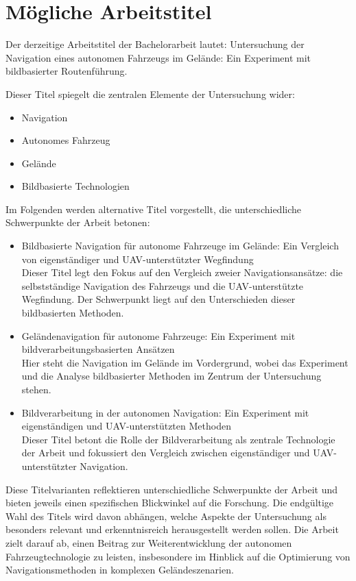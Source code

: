 \section{Mögliche Arbeitstitel}

Der derzeitige Arbeitstitel der Bachelorarbeit lautet: 
Untersuchung der Navigation eines autonomen Fahrzeugs im Gelände: Ein Experiment mit bildbasierter Routenführung.

Dieser Titel spiegelt die zentralen Elemente der Untersuchung wider:
\begin{itemize}
    \item Navigation
    \item Autonomes Fahrzeug
    \item Gelände
    \item Bildbasierte Technologien
\end{itemize}

Im Folgenden werden alternative Titel vorgestellt, die unterschiedliche Schwerpunkte der Arbeit betonen:

\begin{itemize}
    \item Bildbasierte Navigation für autonome Fahrzeuge im Gelände: Ein Vergleich von eigenständiger und UAV-unterstützter Wegfindung\\
    Dieser Titel legt den Fokus auf den Vergleich zweier Navigationsansätze: 
    die selbstständige Navigation des Fahrzeugs und die UAV-unterstützte Wegfindung. 
    Der Schwerpunkt liegt auf den Unterschieden dieser bildbasierten Methoden.

    \item Geländenavigation für autonome Fahrzeuge: Ein Experiment mit bildverarbeitungsbasierten Ansätzen\\
    Hier steht die Navigation im Gelände im Vordergrund, wobei das Experiment und die Analyse bildbasierter Methoden im Zentrum der Untersuchung stehen.

    \item Bildverarbeitung in der autonomen Navigation: Ein Experiment mit eigenständigen und UAV-unterstützten Methoden\\
    Dieser Titel betont die Rolle der Bildverarbeitung als zentrale Technologie der Arbeit und fokussiert den Vergleich zwischen eigenständiger und UAV-unterstützter Navigation.
\end{itemize}

Diese Titelvarianten reflektieren unterschiedliche Schwerpunkte der Arbeit und bieten jeweils einen spezifischen Blickwinkel auf die Forschung. 
Die endgültige Wahl des Titels wird davon abhängen, welche Aspekte der Untersuchung als besonders relevant und erkenntnisreich herausgestellt werden sollen. 
Die Arbeit zielt darauf ab, einen Beitrag zur Weiterentwicklung der autonomen Fahrzeugtechnologie zu leisten, insbesondere im Hinblick auf die Optimierung von Navigationsmethoden in komplexen Geländeszenarien.

